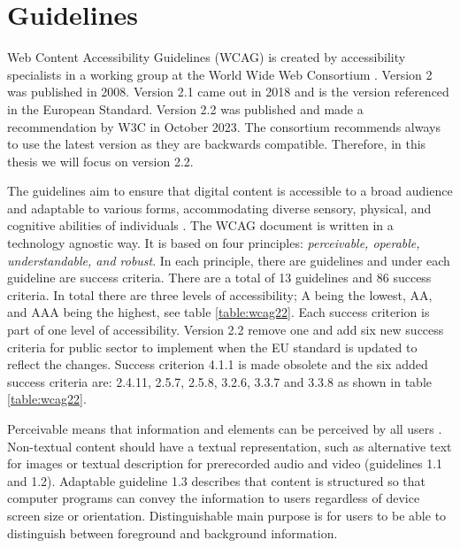 \section{Guidelines}

Web Content Accessibility Guidelines (WCAG) is created by accessibility specialists in a working group at the World Wide Web Consortium \citep{wcagoverview}. Version 2 was published in 2008. Version 2.1 came out in 2018 and is the version referenced in the European Standard. Version 2.2 was published and made a recommendation by W3C in October 2023. The consortium recommends always to use the latest version as they are backwards compatible. Therefore, in this thesis we will focus on version 2.2.

The guidelines aim to ensure that digital content is accessible to a broad audience and adaptable to various forms, accommodating diverse sensory, physical, and cognitive abilities of individuals \citep{wcag22}. The WCAG document is written in a technology agnostic way. It is based on four principles: \textit{perceivable, operable, understandable, and robust}. In each principle, there are guidelines and under each guideline are success criteria. There are a total of 13 guidelines and 86 success criteria. In total there are three levels of accessibility; A being the lowest, AA, and AAA being the highest, see table \ref{table:wcag22}. Each success criterion is part of one level of accessibility. Version 2.2 remove one and add six new success criteria for public sector to implement when the EU standard is updated to reflect the changes. Success criterion 4.1.1 is made obsolete and the six added success criteria are: 2.4.11, 2.5.7, 2.5.8, 3.2.6, 3.3.7 and 3.3.8 as shown in table \ref{table:wcag22}. 



Perceivable means that information and elements can be perceived by all users \citep{wcag22}. Non-textual content should have a textual representation, such as alternative text for images or textual description for prerecorded audio and video (guidelines 1.1 and 1.2). Adaptable guideline 1.3 describes that content is structured so that computer programs can convey the information to users regardless of device screen size or orientation. Distinguishable main purpose is for users to be able to distinguish between foreground and background information.


